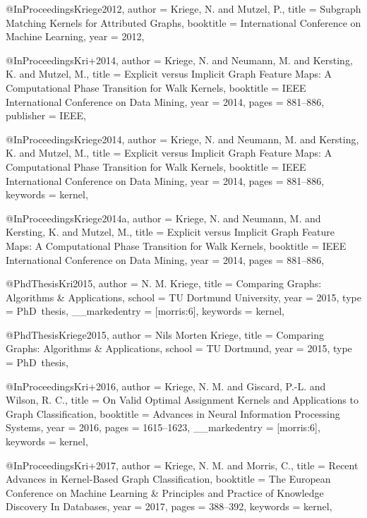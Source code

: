 @InProceedings{Kriege2012,
  author    = {Kriege, N. and Mutzel, P.},
  title     = {Subgraph Matching Kernels for Attributed Graphs},
  booktitle = {International Conference on Machine Learning},
  year      = {2012},
}

@InProceedings{Kri+2014,
  author    = {Kriege, N. and Neumann, M. and Kersting, K. and Mutzel, M.},
  title     = {Explicit versus Implicit Graph Feature Maps: A Computational Phase Transition for Walk Kernels},
  booktitle = {{IEEE} International Conference on Data Mining},
  year      = {2014},
  pages     = {881--886},
  publisher = {IEEE},
}

@InProceedings{Kriege2014,
  author    = {Kriege, N. and Neumann, M. and Kersting, K. and Mutzel, M.},
  title     = {Explicit versus Implicit Graph Feature Maps: {A} Computational Phase Transition for Walk Kernels},
  booktitle = {IEEE International Conference on Data Mining},
  year      = {2014},
  pages     = {881--886},
  keywords  = {kernel},
}

@InProceedings{Kriege2014a,
  author    = {Kriege, N. and Neumann, M. and Kersting, K. and Mutzel, M.},
  title     = {Explicit versus Implicit Graph Feature Maps: {A} Computational Phase Transition for Walk Kernels},
  booktitle = {{IEEE} International Conference on Data Mining},
  year      = {2014},
  pages     = {881--886},
}

@PhdThesis{Kri2015,
  author        = {N. M. Kriege},
  title         = {Comparing Graphs: {A}lgorithms \& Applications},
  school        = {TU Dortmund University},
  year          = {2015},
  type          = {PhD~thesis},
  __markedentry = {[morris:6]},
  keywords      = {kernel},
}

@PhdThesis{Kriege2015,
  author = {Nils Morten Kriege},
  title  = {Comparing Graphs: {A}lgorithms \& Applications},
  school = {TU Dortmund},
  year   = {2015},
  type   = {PhD~thesis},
}

@InProceedings{Kri+2016,
  author        = {Kriege, N. M. and Giscard, P.-L. and Wilson, R. C.},
  title         = {On Valid Optimal Assignment Kernels and Applications to Graph Classification},
  booktitle     = {Advances in Neural Information Processing Systems},
  year          = {2016},
  pages         = {1615--1623},
  __markedentry = {[morris:6]},
  keywords      = {kernel},
}

@InProceedings{Kri+2017,
  author    = {Kriege, N. M. and Morris, C.},
  title     = {Recent Advances in Kernel-Based Graph Classification},
  booktitle = {The European Conference on Machine Learning \& Principles and Practice of Knowledge Discovery In Databases},
  year      = {2017},
  pages     = {388--392},
  keywords  = {kernel},
}

